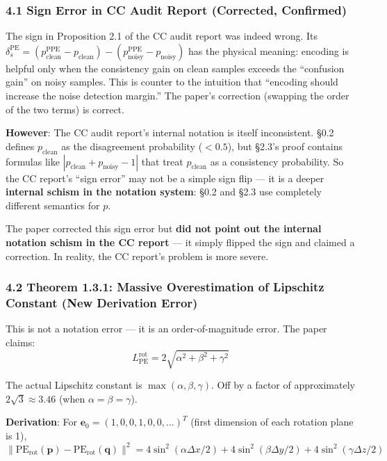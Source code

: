 \documentclass[
  12pt,
]{article}
\begin{document}
\subsubsection{4.1 Sign Error in CC Audit Report (Corrected, Confirmed)}\label{sign-error-cc}

The sign in Proposition 2.1 of the CC audit report was indeed wrong. Its $\delta_s^{\text{PE}} = (p_{\text{clean}}^{\text{PPE}} - p_{\text{clean}}) - (p_{\text{noisy}}^{\text{PPE}} - p_{\text{noisy}})$ has the physical meaning: encoding is helpful only when the consistency gain on clean samples exceeds the ``confusion gain'' on noisy samples. This is counter to the intuition that ``encoding should increase the noise detection margin.'' The paper's correction (swapping the order of the two terms) is correct.

\textbf{However}: The CC audit report's internal notation is itself inconsistent. \S0.2 defines $p_{\text{clean}}$ as the disagreement probability ($<0.5$), but \S2.3's proof contains formulas like $|p_{\text{clean}} + p_{\text{noisy}} - 1|$ that treat $p_{\text{clean}}$ as a consistency probability. So the CC report's ``sign error'' may not be a simple sign flip --- it is a deeper \textbf{internal schism in the notation system}: \S0.2 and \S2.3 use completely different semantics for $p$.

The paper corrected this sign error but \textbf{did not point out the internal notation schism in the CC report} --- it simply flipped the sign and claimed a correction. In reality, the CC report's problem is more severe.

\subsubsection{4.2 Theorem 1.3.1: Massive Overestimation of Lipschitz Constant (New Derivation Error)}\label{thm-1.3.1-overestimation}

This is not a notation error --- it is an order-of-magnitude error. The paper claims:
\[L_{\text{PE}}^{\text{rot}} = 2\sqrt{\alpha^2 + \beta^2 + \gamma^2}\]

The actual Lipschitz constant is $\max(\alpha, \beta, \gamma)$. Off by a factor of approximately $2\sqrt{3} \approx 3.46$ (when $\alpha=\beta=\gamma$).

\textbf{Derivation}: For $\mathbf{e}_0 = (1,0,0,1,0,0,\ldots)^T$ (first dimension of each rotation plane is 1),
\[\|\text{PE}_{\text{rot}}(\mathbf{p}) - \text{PE}_{\text{rot}}(\mathbf{q})\|^2 = 4\sin^2(\alpha\Delta x/2) + 4\sin^2(\beta\Delta y/2) + 4\sin^2(\gamma\Delta z/2)\]
\end{document}
